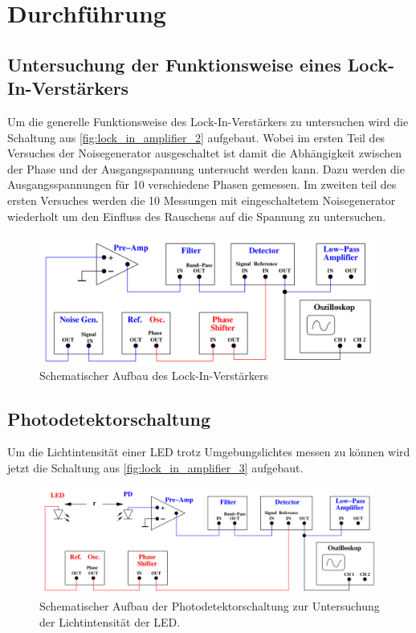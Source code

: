 \section{Durchführung}
\label{sec:Durchführung}


\subsection{Untersuchung der Funktionsweise eines Lock-In-Verstärkers}
Um die generelle Funktionsweise des Lock-In-Verstärkers zu untersuchen wird die Schaltung aus \autoref{fig:lock_in_amplifier_2} aufgebaut.
Wobei im ersten Teil des Versuches der Noisegenerator ausgeschaltet ist damit die Abhängigkeit zwischen der Phase und der Ausgangsspannung untersucht werden kann.
Dazu werden die Ausgangsspannungen für 10 verschiedene Phasen gemessen.
Im zweiten teil des ersten Versuches werden die 10 Messungen mit eingeschaltetem Noisegenerator wiederholt um den Einfluss
des Rauschens auf die Spannung zu untersuchen.

\begin{figure}
  \centering
  \includegraphics[scale=0.4]{assets/lock_in_amplifier_2.png}
  \caption{Schematischer Aufbau des Lock-In-Verstärkers \cite{V303}}
  \label{fig:lock_in_amplifier_2}
\end{figure}


\subsection{Photodetektorschaltung}
Um die Lichtintensität einer LED trotz Umgebungslichtes messen zu können wird jetzt die Schaltung aus \autoref{fig:lock_in_amplifier_3} aufgebaut.


\begin{figure}
  \centering
  \includegraphics[scale=0.4]{assets/lock_in_amplifier_3.png}
  \caption{Schematischer Aufbau der Photodetektorschaltung zur Untersuchung der Lichtintensität der LED. \cite{V303}}
  \label{fig:lock_in_amplifier_3}
\end{figure}

